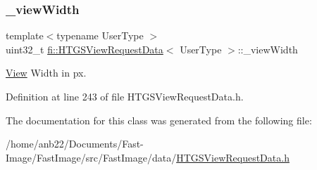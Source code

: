 \mbox{\label{classfi_1_1HTGSViewRequestData_acc0d6a79e73c3052f0fbff6add02240b}} 
\subsubsection{\texorpdfstring{\+\_\+view\+Width}{\_viewWidth}}
{\footnotesize\ttfamily template$<$typename User\+Type $>$ \\
uint32\+\_\+t \hyperlink{classfi_1_1HTGSViewRequestData}{fi\+::\+H\+T\+G\+S\+View\+Request\+Data}$<$ User\+Type $>$\+::\+\_\+view\+Width\hspace{0.3cm}{\ttfamily [private]}}



\hyperlink{classfi_1_1View}{View} Width in px. 



Definition at line 243 of file H\+T\+G\+S\+View\+Request\+Data.\+h.



The documentation for this class was generated from the following file\+:\begin{DoxyCompactItemize}
\item 
/home/anb22/\+Documents/\+Fast-\/\+Image/\+Fast\+Image/src/\+Fast\+Image/data/\hyperlink{HTGSViewRequestData_8h}{H\+T\+G\+S\+View\+Request\+Data.\+h}\end{DoxyCompactItemize}
